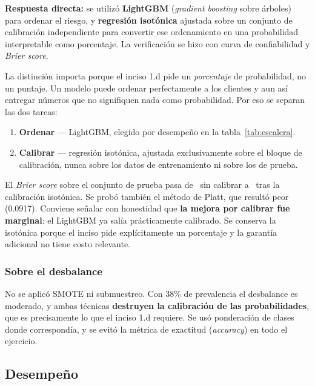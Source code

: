 \documentclass[11pt,a4paper]{article}
\begin{document}
\begin{nota}
\textbf{Respuesta directa:} se utilizó \textbf{LightGBM} (\emph{gradient boosting}
sobre árboles) para ordenar el riesgo, y \textbf{regresión isotónica} ajustada
sobre un conjunto de calibración independiente para convertir ese ordenamiento en
una probabilidad interpretable como porcentaje. La verificación se hizo con curva
de confiabilidad y \emph{Brier score}.
\end{nota}

\noindent La distinción importa porque el inciso 1.d pide un \emph{porcentaje} de
probabilidad, no un puntaje. Un modelo puede ordenar perfectamente a los clientes
y aun así entregar números que no signifiquen nada como probabilidad. Por eso se
separan las dos tareas:

\begin{enumerate}[leftmargin=*,nosep]
\item \textbf{Ordenar} --- LightGBM, elegido por desempeño en la tabla~\ref{tab:escalera}.
\item \textbf{Calibrar} --- regresión isotónica, ajustada exclusivamente sobre el
      bloque de calibración, nunca sobre los datos de entrenamiento ni sobre los
      de prueba.
\end{enumerate}

\noindent El \emph{Brier score} sobre el conjunto de prueba pasa de \BrierSC\ sin
calibrar a \BrierCal\ tras la calibración isotónica. Se probó también el método de
Platt, que resultó peor (0.0917). Conviene señalar con honestidad que
\textbf{la mejora por calibrar fue marginal}: el LightGBM ya salía prácticamente
calibrado. Se conserva la isotónica porque el inciso pide explícitamente un
porcentaje y la garantía adicional no tiene costo relevante.

\subsubsection*{Sobre el desbalance}

No se aplicó SMOTE ni submuestreo. Con 38\% de prevalencia el desbalance es
moderado, y ambas técnicas \textbf{destruyen la calibración de las
probabilidades}, que es precisamente lo que el inciso 1.d requiere. Se usó
ponderación de clases donde correspondía, y se evitó la métrica de exactitud
(\emph{accuracy}) en todo el ejercicio.

\subsection{Desempeño}
\end{document}
